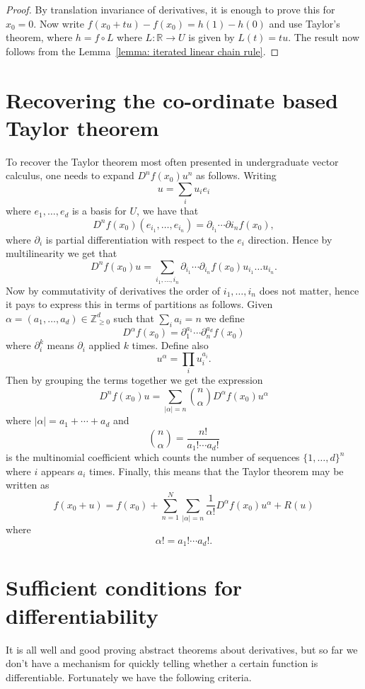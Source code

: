 \documentclass[twoside, a4paper, 10pt]{amsart}
\begin{document}
\begin{proof} By translation invariance of derivatives, it is enough to prove this for $x_0 = 0$. Now write $f(x_0 + tu) - f(x_0) = h(1) - h(0)$ and use Taylor's theorem, where $h = f \circ L$ where $L:\mathbb{R} \to U$ is given by $L(t) = tu$. The result now follows from the Lemma~\ref{lemma: iterated linear chain rule}.
\end{proof}

\section{Recovering the co-ordinate based Taylor theorem}

To recover the Taylor theorem most often presented in undergraduate vector calculus, one needs to expand $D^nf(x_0) u^n$ as follows. Writing $$u = \sum_i u_i e_i$$ where $e_1, \ldots, e_d$ is a basis for $U$, we have that $$D^nf(x_0) (e_{i_1}, \ldots, e_{i_n}) = \partial_{i_1} \cdots \partial{i_n}f(x_0),$$ where $\partial_i$ is partial differentiation with respect to the $e_i$ direction. Hence by multilinearity we get that $$D^nf(x_0)u = \sum_{i_1, \ldots, i_n} \partial_{i_1} \cdots \partial_{i_n}f(x_0) u_{i_1} \ldots u_{i_n}.$$ Now by commutativity of derivatives the order of $i_1, \ldots, i_n$ does not matter, hence it pays to express this in terms of partitions as follows. Given $\alpha = (a_1, \ldots, a_d) \in \mathbb{Z}_{\geq 0}^d$ such that $\sum_i a_i = n$ we define $$D^{\alpha}f(x_0) = \partial_1^{a_1} \cdots \partial_n^{a_d} f(x_0)$$ where $\partial_i^{k}$ means $\partial_i$ applied $k$ times. Define also $$u^{\alpha} = \prod_{i} u_i^{a_i}.$$ Then by grouping the terms together we get the expression $$D^n f(x_0) u = \sum_{|\alpha| = n} \binom{n}{\alpha} D^{\alpha}f(x_0) u ^{\alpha}$$ where $|\alpha| = a_1 + \cdots + a_d$ and $$\binom{n}{\alpha} = \frac{n!}{a_1 ! \cdots a_d!}$$ is the multinomial coefficient which counts the number of sequences $\{1, \ldots, d\}^n$ where $i$ appears $a_i$ times. Finally, this means that the Taylor theorem may be written as $$ f(x_0 + u ) = f(x_0) + \sum_{n=1}^N \sum_{|\alpha| = n} \frac{1}{\alpha!} D^{\alpha}f(x_0) u^{\alpha}  + R(u) $$ where $$ \alpha! = a_1! \cdots a_d!.$$

\section{Sufficient conditions for differentiability}

It is all well and good proving abstract theorems about derivatives, but so far we don't have a mechanism for quickly telling whether a certain function is differentiable. Fortunately we have the following criteria. 
\end{document}
